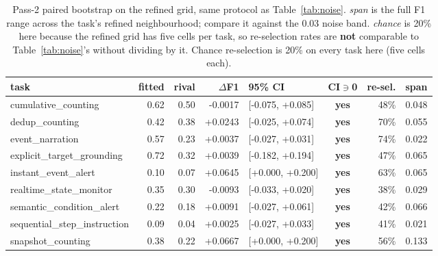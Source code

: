 \documentclass[11pt,a4paper]{article}
\begin{document}
\begin{table}[t]\centering\small\caption{Pass-2 paired bootstrap on the refined grid, same protocol as Table~\ref{tab:noise}. \emph{span} is the full F1 range across the task's refined neighbourhood; compare it against the 0.03 noise band. \emph{chance} is 20\% here because the refined grid has five cells per task, so re-selection rates are \textbf{not} comparable to Table~\ref{tab:noise}'s without dividing by it. Chance re-selection is 20\% on every task here (five cells each).}\label{tab:noise2}
\begin{tabular}{lrrrlcrr}\toprule
task & fitted & rival & $\Delta$F1 & 95\% CI & CI$\ni$0 & re-sel. & span \\\midrule
cumulative\_counting & 0.62 & 0.50 & -0.0017 & [-0.075, +0.085] & \textbf{yes} & 48\% & 0.048 \\
dedup\_counting & 0.42 & 0.38 & +0.0243 & [-0.025, +0.074] & \textbf{yes} & 70\% & 0.055 \\
event\_narration & 0.57 & 0.23 & +0.0037 & [-0.027, +0.031] & \textbf{yes} & 74\% & 0.022 \\
explicit\_target\_grounding & 0.72 & 0.32 & +0.0039 & [-0.182, +0.194] & \textbf{yes} & 47\% & 0.065 \\
instant\_event\_alert & 0.10 & 0.07 & +0.0645 & [+0.000, +0.200] & \textbf{yes} & 63\% & 0.065 \\
realtime\_state\_monitor & 0.35 & 0.30 & -0.0093 & [-0.033, +0.020] & \textbf{yes} & 38\% & 0.029 \\
semantic\_condition\_alert & 0.22 & 0.18 & +0.0091 & [-0.027, +0.061] & \textbf{yes} & 42\% & 0.066 \\
sequential\_step\_instruction & 0.09 & 0.04 & +0.0025 & [-0.027, +0.033] & \textbf{yes} & 41\% & 0.021 \\
snapshot\_counting & 0.38 & 0.22 & +0.0667 & [+0.000, +0.200] & \textbf{yes} & 56\% & 0.133 \\
\bottomrule\end{tabular}\end{table}
\end{document}
